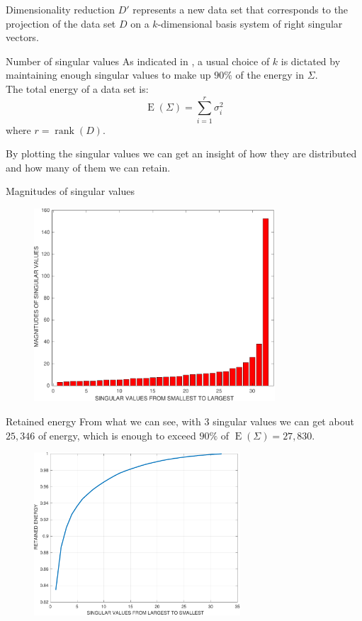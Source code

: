 \documentclass[10pt]{beamer}
\DeclareMathOperator{\rank}{rank}
\DeclareMathOperator{\energy}{E}
\begin{document}
\begin{frame}{Dimensionality reduction}
    $D'$ represents a new data set that corresponds to the projection of the data set $D$ on a $k$-dimensional basis system of right singular vectors. 

    \begin{block}{Number of singular values}
        As indicated in \cite{leskovec2020mining}, a usual choice of $k$ is dictated by maintaining enough singular values to make up $90 \% $ of the energy in $\Sigma$. \\
        The total energy of a data set is:
        $$ \energy ( \Sigma )  = \sum_{i = 1}^{r} \sigma_i^2 $$
        where $r = \rank (D)$.
    \end{block}

    By plotting the singular values we can get an insight of how they are distributed and how many of them we can retain. 
\end{frame}

\begin{frame}{Magnitudes of singular values}
    \begin{figure}[t]
        \includegraphics[width=9cm]{singular_values_magnitudes.pdf}
        \centering
    \end{figure}
\end{frame}

\begin{frame}{Retained energy}
    From what we can see, with $3$ singular values we can get about $25{,}346$ of energy, which is enough to exceed $90 \%$ of $\energy ( \Sigma ) = 27{,}830$. 
    \begin{figure}[t]
        \includegraphics[width=7.7cm]{retained_energy.pdf}
        \centering
    \end{figure}
\end{frame}
\end{document}
